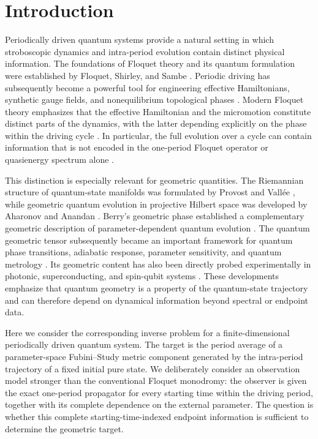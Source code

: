 \documentclass[twocolumn,prl,aps,floatfix]{revtex4-2}
\begin{document}
\section{Introduction}

Periodically driven quantum systems provide a natural setting in which stroboscopic dynamics and intra-period evolution contain distinct physical information. The foundations of Floquet theory and its quantum formulation were established by Floquet, Shirley, and Sambe \cite{Floquet1883,Shirley1965,Sambe1973}. Periodic driving has subsequently become a powerful tool for engineering effective Hamiltonians, synthetic gauge fields, and nonequilibrium topological phases \cite{Kitagawa2010,LindnerRefaelGalitski2011,GoldmanDalibard2014,OkaKitamura2019}. Modern Floquet theory emphasizes that the effective Hamiltonian and the micromotion constitute distinct parts of the dynamics, with the latter depending explicitly on the phase within the driving cycle \cite{BukovDAlessioPolkovnikov2015,EckardtAnisimovas2015,Eckardt2017,Holthaus2016}. In particular, the full evolution over a cycle can contain information that is not encoded in the one-period Floquet operator or quasienergy spectrum alone \cite{Rudner2013,NathanRudner2015}.

This distinction is especially relevant for geometric quantities. The Riemannian structure of quantum-state manifolds was formulated by Provost and Vallée \cite{ProvostVallee1980}, while geometric quantum evolution in projective Hilbert space was developed by Aharonov and Anandan \cite{AharonovAnandan1987}. Berry's geometric phase established a complementary geometric description of parameter-dependent quantum evolution \cite{Berry1984,Simon1983}. The quantum geometric tensor subsequently became an important framework for quantum phase transitions, adiabatic response, parameter sensitivity, and quantum metrology \cite{BraunsteinCaves1994,ZanardiPaunkovic2006,ZanardiGiordaCozzini2007,Kolodrubetz2017}. Its geometric content has also been directly probed experimentally in photonic, superconducting, and spin-qubit systems \cite{Bleu2018,Tan2019,Yu2019,Gianfrate2020}. These developments emphasize that quantum geometry is a property of the quantum-state trajectory and can therefore depend on dynamical information beyond spectral or endpoint data.

Here we consider the corresponding inverse problem for a finite-dimensional periodically driven quantum system. The target is the period average of a parameter-space Fubini--Study metric component generated by the intra-period trajectory of a fixed initial pure state. We deliberately consider an observation model stronger than the conventional Floquet monodromy: the observer is given the exact one-period propagator for every starting time within the driving period, together with its complete dependence on the external parameter. The question is whether this complete starting-time-indexed endpoint information is sufficient to determine the geometric target.
\end{document}
